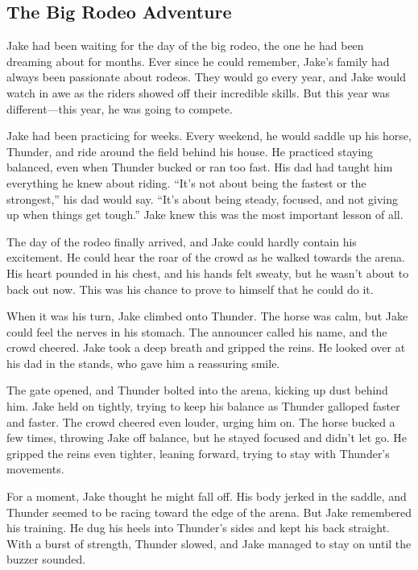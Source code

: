 \documentclass[12pt]{article}
\begin{document}
\onehalfspacing


\subsection*{The Big Rodeo Adventure}

\begin{tcolorbox}[colframe=black!40, colback=gray!5]

\begin{spacing}{1.15}
    Jake had been waiting for the day of the big rodeo, the one he had been dreaming about for months. Ever since he could remember, Jake’s family had always been passionate about rodeos. They would go every year, and Jake would watch in awe as the riders showed off their incredible skills. But this year was different—this year, he was going to compete.

Jake had been practicing for weeks. Every weekend, he would saddle up his horse, Thunder, and ride around the field behind his house. He practiced staying balanced, even when Thunder bucked or ran too fast. His dad had taught him everything he knew about riding. “It’s not about being the fastest or the strongest,” his dad would say. “It’s about being steady, focused, and not giving up when things get tough.” Jake knew this was the most important lesson of all.

The day of the rodeo finally arrived, and Jake could hardly contain his excitement. He could hear the roar of the crowd as he walked towards the arena. His heart pounded in his chest, and his hands felt sweaty, but he wasn’t about to back out now. This was his chance to prove to himself that he could do it.

When it was his turn, Jake climbed onto Thunder. The horse was calm, but Jake could feel the nerves in his stomach. The announcer called his name, and the crowd cheered. Jake took a deep breath and gripped the reins. He looked over at his dad in the stands, who gave him a reassuring smile.

The gate opened, and Thunder bolted into the arena, kicking up dust behind him. Jake held on tightly, trying to keep his balance as Thunder galloped faster and faster. The crowd cheered even louder, urging him on. The horse bucked a few times, throwing Jake off balance, but he stayed focused and didn’t let go. He gripped the reins even tighter, leaning forward, trying to stay with Thunder’s movements.

For a moment, Jake thought he might fall off. His body jerked in the saddle, and Thunder seemed to be racing toward the edge of the arena. But Jake remembered his training. He dug his heels into Thunder’s sides and kept his back straight. With a burst of strength, Thunder slowed, and Jake managed to stay on until the buzzer sounded.


\end{spacing}
\end{tcolorbox}
\end{document}
